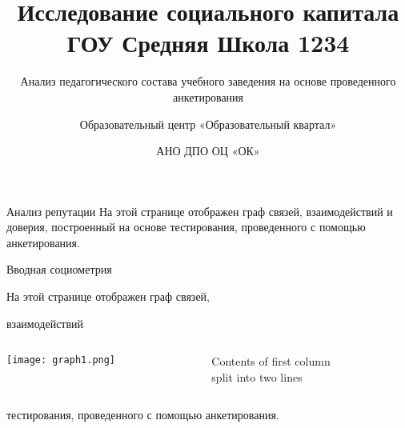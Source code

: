 \documentclass{beamer}
\title[ГОУ СОШ \No 1234] %
{Исследование социального капитала ГОУ Средняя Школа 1234 }
\subtitle
{Анализ педагогического состава учебного заведения на основе проведенного анкетирования}
\author[Июнь-август 2014]{Образовательный центр «Образовательный квартал»}
\date{\textcopyright АНО ДПО ОЦ «ОК» }
\begin{document}
\begin{frame}
  \titlepage
\end{frame}


\begin{frame}
\begin{block}{Анализ репутации}
На этой странице отображен граф связей, взаимодействий и доверия, построенный на основе 
тестирования, проведенного с помощью анкетирования.
\end{block}

\end{frame}




\begin{frame}{Вводная социометрия}

На этой странице отображен граф связей, 

взаимодействий 
\begin{columns}[T] %
\begin{column}{6cm} %
\centering
          \texttt{[image: graph1.png]}
\end{column}
\begin{column}{0.3\textwidth} %
     Contents of first column \\ split into two lines
\end{column}
\end{columns}


тестирования, проведенного с помощью анкетирования.

\end{frame}

\end{document}
